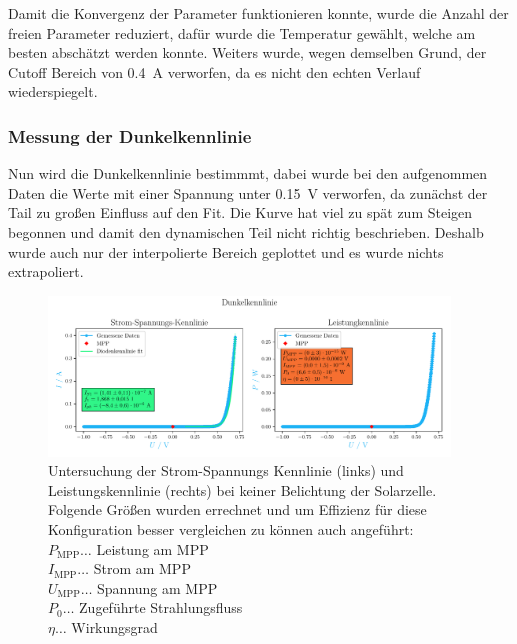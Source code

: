 \documentclass[12pt,english,ngerman]{scrartcl}
\begin{document}

Damit die Konvergenz der Parameter funktionieren konnte, wurde die Anzahl der
freien Parameter reduziert, dafür wurde die Temperatur gewählt, welche am
besten abschätzt werden konnte. Weiters wurde, wegen demselben Grund, der
Cutoff Bereich von \SI{0.4}{\ampere} verworfen, da es nicht den echten Verlauf
wiederspiegelt.

\subsubsection{Messung der Dunkelkennlinie}

Nun wird die Dunkelkennlinie bestimmmt, dabei wurde bei den aufgenommen Daten
die Werte mit einer Spannung unter \SI{0.15}{\volt} verworfen, da zunächst der
Tail zu großen Einfluss auf den Fit. Die Kurve hat viel zu spät zum Steigen
begonnen und damit den dynamischen Teil nicht richtig beschrieben. Deshalb
wurde auch nur der interpolierte Bereich geplottet und es wurde nichts
extrapoliert.

\begin{figure}[H]
	\centering
	\includegraphics[width=0.95\textwidth]{figures/dunkelkennlinie.pdf}
	\caption[Dunkelkennlinie einer Solarzelle]{Untersuchung der Strom-Spannungs Kennlinie
		(links) und Leistungskennlinie (rechts) bei keiner Belichtung der Solarzelle.
		Folgende Größen wurden errechnet und um Effizienz für diese Konfiguration
		besser vergleichen zu können auch angeführt: \\
		$P_\text{MPP} \dots$ Leistung am MPP         \\
		$I_\text{MPP} \dots$ Strom am MPP            \\
		$U_\text{MPP} \dots$ Spannung am MPP         \\
		$P_0 \dots$ Zugeführte Strahlungsfluss       \\
		$\eta \dots$ Wirkungsgrad
	}\label{fig:ausw_kennlinie_dunkel}
\end{figure}
\end{document}
